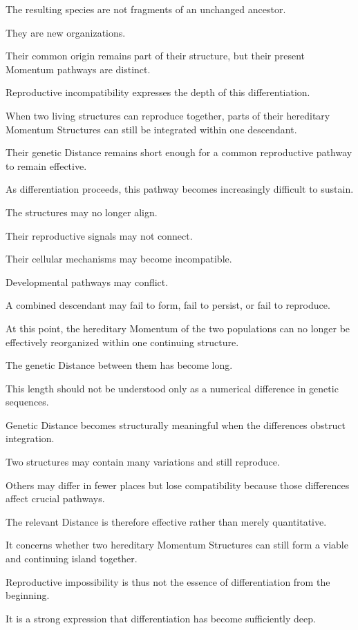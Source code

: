 The resulting species are not fragments of an unchanged ancestor.

They are new organizations.

Their common origin remains part of their structure, but their present Momentum pathways are distinct.

Reproductive incompatibility expresses the depth of this differentiation.

When two living structures can reproduce together, parts of their hereditary Momentum Structures can still be integrated within one descendant.

Their genetic Distance remains short enough for a common reproductive pathway to remain effective.

As differentiation proceeds, this pathway becomes increasingly difficult to sustain.

The structures may no longer align.

Their reproductive signals may not connect.

Their cellular mechanisms may become incompatible.

Developmental pathways may conflict.

A combined descendant may fail to form, fail to persist, or fail to reproduce.

At this point, the hereditary Momentum of the two populations can no longer be effectively reorganized within one continuing structure.

The genetic Distance between them has become long.

This length should not be understood only as a numerical difference in genetic sequences.

Genetic Distance becomes structurally meaningful when the differences obstruct integration.

Two structures may contain many variations and still reproduce.

Others may differ in fewer places but lose compatibility because those differences affect crucial pathways.

The relevant Distance is therefore effective rather than merely quantitative.

It concerns whether two hereditary Momentum Structures can still form a viable and continuing island together.

Reproductive impossibility is thus not the essence of differentiation from the beginning.

It is a strong expression that differentiation has become sufficiently deep.

